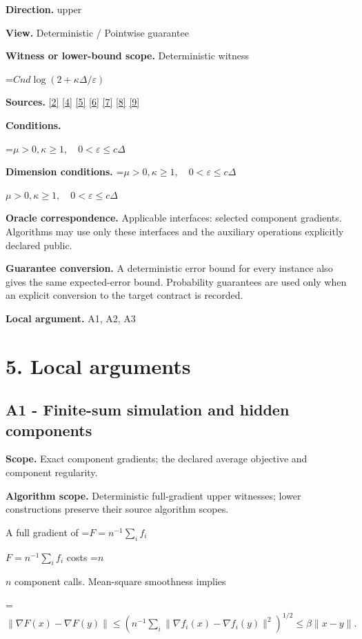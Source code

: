 \documentclass[10pt,a4paper]{article}
\newcommand{\AtlasMath}[1]{\par\begingroup\centering\setbox0=\hbox{$\displaystyle #1$}\ifdim\wd0>1.4\linewidth\typeout{ATLAS WIDE FORMULA: \the\wd0}\fi\ifdim\wd0>\linewidth\resizebox{\linewidth}{!}{\box0}\else\box0\fi\par\endgroup}
\newcommand{\AtlasInlineMath}[1]{\begingroup\setbox0=\hbox{$#1$}\ifdim\wd0>.4\linewidth\endgroup\AtlasMath{#1}\else\endgroup$#1$\fi}
\begin{document}
\textbf{Direction.} upper

\textbf{View.} Deterministic / Pointwise guarantee

\textbf{Witness or lower-bound scope.} Deterministic witness

\AtlasMath{Cnd\log(2+\kappa\Delta/\varepsilon)}
\textbf{Sources.} \href{https://proceedings.mlr.press/v97/zhou19b/zhou19b.pdf}{[2]} \href{https://arxiv.org/pdf/1405.4980}{[4]} \href{https://arxiv.org/pdf/2101.09740v2}{[5]} \href{https://arxiv.org/pdf/2609.33360v2}{[6]} \href{https://arxiv.org/pdf/2609.10874}{[7]} \href{https://www2.isye.gatech.edu/~nemirovs/MOR_AccuracyCertificates.pdf}{[8]} \href{https://arxiv.org/pdf/2609.20701}{[9]}

\textbf{Conditions.} 
\AtlasMath{\mu>0,\kappa\ge1,\quad0<\varepsilon\le c\Delta}


\textbf{Dimension conditions.} \AtlasInlineMath{\mu>0,\kappa\ge1,\quad0<\varepsilon\le c\Delta}

\textbf{Oracle correspondence.} Applicable interfaces: selected component gradients. Algorithms may use only these interfaces and the auxiliary operations explicitly declared public.

\textbf{Guarantee conversion.} A deterministic error bound for every instance also gives the same expected-error bound. Probability guarantees are used only when an explicit conversion to the target contract is recorded.

\textbf{Local argument.} A1, A2, A3

\section{5. Local arguments}
\subsection{A1 - Finite-sum simulation and hidden components}
\textbf{Scope.} Exact component gradients; the declared average objective and component regularity.

\textbf{Algorithm scope.} Deterministic full-gradient upper witnesses; lower constructions preserve their source algorithm scopes.

A full gradient of \AtlasInlineMath{F=n^{-1}\sum_i f_i} costs \AtlasInlineMath{n} component calls. Mean-square smoothness implies

\AtlasMath{\|\nabla F(x)-\nabla F(y)\|
\le(n^{-1}\sum_i\|\nabla f_i(x)-\nabla f_i(y)\|^2)^{1/2}
\le\beta\|x-y\|.}
\end{document}
